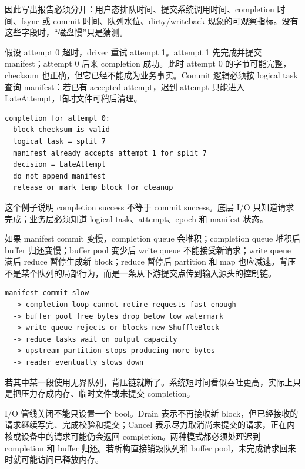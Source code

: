 因此写出报告必须分开：用户态排队时间、提交系统调用时间、completion 时间、fsync 或 commit 时间、队列水位、dirty/writeback 现象的可观察指标。没有这些字段时，“磁盘慢”只是猜测。

假设 attempt 0 超时，driver 重试 attempt 1。attempt 1 先完成并提交 manifest；attempt 0 后来 completion 成功。此时 attempt 0 的字节可能完整，checksum 也正确，但它已经不能成为业务事实。Commit 逻辑必须按 logical task 查询 manifest：若已有 accepted attempt，迟到 attempt 只能进入 LateAttempt，临时文件可稍后清理。

\begin{lstlisting}[numbers=none,caption={迟到 completion 的提交判定}]
completion for attempt 0:
  block checksum is valid
  logical task = split 7
  manifest already accepts attempt 1 for split 7
  decision = LateAttempt
  do not append manifest
  release or mark temp block for cleanup
\end{lstlisting}

这个例子说明 completion success 不等于 commit success。底层 I/O 只知道请求完成；业务层必须知道 logical task、attempt、epoch 和 manifest 状态。

如果 manifest commit 变慢，completion queue 会堆积；completion queue 堆积后 buffer 归还变慢；buffer pool 变少后 write queue 不能接受新请求；write queue 满后 reduce 暂停生成新 block；reduce 暂停后 partition 和 map 也应减速。背压不是某个队列的局部行为，而是一条从下游提交点传到输入源头的控制链。

\begin{lstlisting}[numbers=none,caption={背压传播链}]
manifest commit slow
  -> completion loop cannot retire requests fast enough
  -> buffer pool free bytes drop below low watermark
  -> write queue rejects or blocks new ShuffleBlock
  -> reduce tasks wait on output capacity
  -> upstream partition stops producing more bytes
  -> reader eventually slows down
\end{lstlisting}

若其中某一段使用无界队列，背压链就断了。系统短时间看似吞吐更高，实际上只是把压力存成内存、临时文件或未提交 completion。

I/O 管线关闭不能只设置一个 bool。Drain 表示不再接收新 block，但已经接收的请求继续写完、完成校验和提交；Cancel 表示尽力取消尚未提交的请求，正在内核或设备中的请求可能仍会返回 completion。两种模式都必须处理迟到 completion 和 buffer 归还。若析构直接销毁队列和 buffer pool，未完成请求回来时就可能访问已释放内存。

